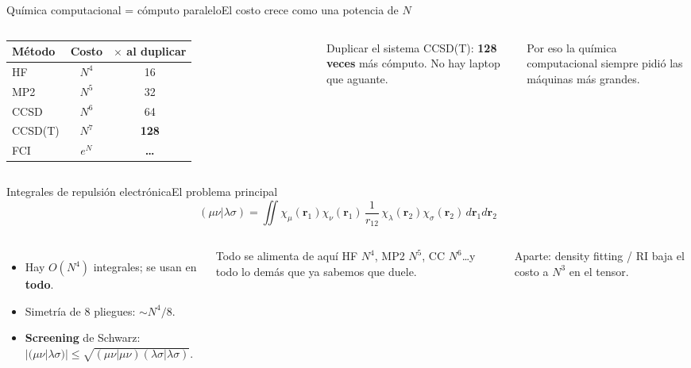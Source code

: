 \documentclass[aspectratio=169]{beamer}
\newcommand{\cplx}[1]{{\footnotesize\color{cookieMuted}#1}}
\newcommand{\vr}{\mathbf{r}}
\begin{document}
\begin{frame}{Química computacional = cómputo paralelo}{El costo crece como una potencia de $N$}
  \begin{columns}[T,onlytextwidth]
      \centering
      \begin{tabular}{lcc}
        \toprule
        \textbf{Método} & \textbf{Costo} & \textbf{$\times$ al duplicar}\\
        \midrule
        HF & $N^4$ & 16\\
        MP2 & $N^5$ & 32\\
        CCSD & $N^6$ & 64\\
        CCSD(T) & $N^7$ & \textbf{128}\\
        FCI & $e^{N}$ & \textcolor{red!70!black}{\textbf{\ldots}}\\
        \bottomrule
      \end{tabular}
      \begin{alertblock}{Duplicar el sistema}
        CCSD(T): \textbf{128 veces} más cómputo. No hay laptop que aguante.
      \end{alertblock}
      \cplx{Por eso la química computacional siempre pidió las máquinas más grandes.}
  \end{columns}
\end{frame}

\begin{frame}{Integrales de repulsión electrónica}{El problema principal}
  \[ (\mu\nu|\lambda\sigma)=\iint\chi_\mu(\vr_1)\chi_\nu(\vr_1)\,\frac{1}{r_{12}}\,\chi_\lambda(\vr_2)\chi_\sigma(\vr_2)\,d\vr_1d\vr_2 \]
  \begin{columns}[T,onlytextwidth]
      \begin{itemize}\setlength\itemsep{4pt}
        \item Hay \textbf{$O(N^4)$} integrales; se usan en \textbf{todo}.
        \item Simetría de 8 pliegues: $\sim N^4/8$.
        \item \textbf{Screening} de Schwarz: $|(\mu\nu|\lambda\sigma)|\le\sqrt{(\mu\nu|\mu\nu)(\lambda\sigma|\lambda\sigma)}$.
      \end{itemize}
      \begin{exampleblock}{Todo se alimenta de aquí}
        HF $N^4$, MP2 $N^5$, CC $N^6$\ldots y todo lo demás que ya sabemos que duele.
      \end{exampleblock}
      \cplx{Aparte: density fitting / RI baja el costo a $N^3$ en el tensor.}
  \end{columns}
\end{frame}
\end{document}
